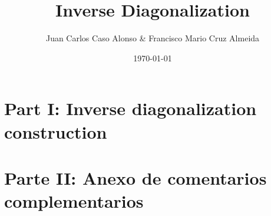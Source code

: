 \documentclass[notitlepage]{report}
\title{Inverse Diagonalization}
\author{Juan Carlos Caso Alonso \& Francisco Mario Cruz Almeida}
\date{\today}
\begin{document}
	
	\maketitle
	\thispagestyle{empty}
	
	
		
	
	\tableofcontents
	
	\part{Part I: Inverse diagonalization construction}

	
	
	
	\part{Parte II: Anexo de comentarios complementarios}
	
	
\end{document}
